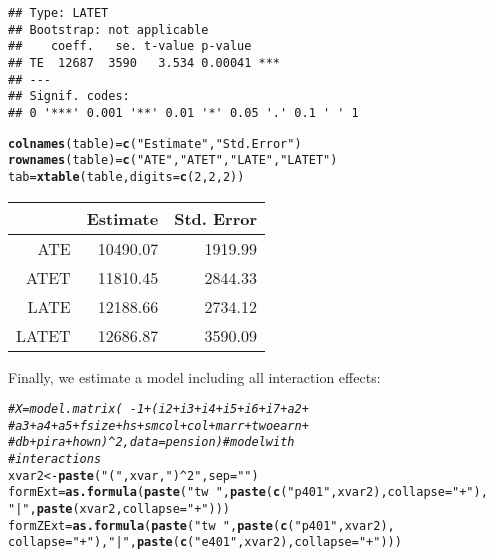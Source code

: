 \documentclass{amsart}\usepackage[]{graphicx}\usepackage[]{color}
\makeatletter
\newcommand{\hlnum}[1]{\textcolor[rgb]{0.686,0.059,0.569}{#1}}%
\newcommand{\hlstr}[1]{\textcolor[rgb]{0.192,0.494,0.8}{#1}}%
\newcommand{\hlcom}[1]{\textcolor[rgb]{0.678,0.584,0.686}{\textit{#1}}}%
\newcommand{\hlstd}[1]{\textcolor[rgb]{0.345,0.345,0.345}{#1}}%
\newcommand{\hlkwb}[1]{\textcolor[rgb]{0.69,0.353,0.396}{#1}}%
\newcommand{\hlkwc}[1]{\textcolor[rgb]{0.333,0.667,0.333}{#1}}%
\newcommand{\hlkwd}[1]{\textcolor[rgb]{0.737,0.353,0.396}{\textbf{#1}}}%
\newenvironment{kframe}{%
 \def\at@end@of@kframe{}%
 \ifinner\ifhmode%
  \def\at@end@of@kframe{\end{minipage}}%
  \begin{minipage}{\columnwidth}%
 \fi\fi%
 \def\FrameCommand##1{\hskip\@totalleftmargin \hskip-\fboxsep
 \colorbox{shadecolor}{##1}\hskip-\fboxsep
     \hskip-\linewidth \hskip-\@totalleftmargin \hskip\columnwidth}%
 \MakeFramed {\advance\hsize-\width
   \@totalleftmargin\z@ \linewidth\hsize
   \@setminipage}}%
 {\par\unskip\endMakeFramed%
 \at@end@of@kframe}
\newenvironment{knitrout}{}{} %
\makeatother
\begin{document}
\begin{knitrout}
\begin{kframe}
\begin{verbatim}
## Type: LATET 
## Bootstrap: not applicable 
##    coeff.   se. t-value p-value    
## TE  12687  3590   3.534 0.00041 ***
## ---
## Signif. codes:  
## 0 '***' 0.001 '**' 0.01 '*' 0.05 '.' 0.1 ' ' 1
\end{verbatim}
\begin{alltt}
\hlkwd{colnames}\hlstd{(table)} \hlkwb{=} \hlkwd{c}\hlstd{(}\hlstr{"Estimate"}\hlstd{,} \hlstr{"Std. Error"}\hlstd{)}
\hlkwd{rownames}\hlstd{(table)} \hlkwb{=} \hlkwd{c}\hlstd{(}\hlstr{"ATE"}\hlstd{,} \hlstr{"ATET "}\hlstd{,} \hlstr{"LATE"}\hlstd{,} \hlstr{"LATET"}\hlstd{)}
\hlstd{tab} \hlkwb{=} \hlkwd{xtable}\hlstd{(table,} \hlkwc{digits} \hlstd{=} \hlkwd{c}\hlstd{(}\hlnum{2}\hlstd{,} \hlnum{2}\hlstd{,} \hlnum{2}\hlstd{))}
\end{alltt}
\end{kframe}
\end{knitrout}

\begin{table}[ht]
\centering
\begin{tabular}{rrr}
  \hline
 & Estimate & Std. Error \\ 
  \hline
ATE & 10490.07 & 1919.99 \\ 
  ATET  & 11810.45 & 2844.33 \\ 
  LATE & 12188.66 & 2734.12 \\ 
  LATET & 12686.87 & 3590.09 \\ 
   \hline
\end{tabular}
\end{table}


Finally, we estimate a model including all interaction effects:

\begin{knitrout}
\color{fgcolor}\begin{kframe}
\begin{alltt}
\hlcom{# X = model.matrix(~ -1 + (i2 + i3 + i4 + i5 + i6 + i7 + a2 +}
\hlcom{# a3 + a4 + a5 + fsize + hs + smcol + col + marr + twoearn +}
\hlcom{# db + pira + hown)^2, data = pension) # model with}
\hlcom{# interactions}
\hlstd{xvar2} \hlkwb{<-} \hlkwd{paste}\hlstd{(}\hlstr{"("}\hlstd{, xvar,} \hlstr{")^2"}\hlstd{,} \hlkwc{sep} \hlstd{=} \hlstr{""}\hlstd{)}
\hlstd{formExt} \hlkwb{=} \hlkwd{as.formula}\hlstd{(}\hlkwd{paste}\hlstd{(}\hlstr{"tw ~ "}\hlstd{,} \hlkwd{paste}\hlstd{(}\hlkwd{c}\hlstd{(}\hlstr{"p401"}\hlstd{, xvar2),} \hlkwc{collapse} \hlstd{=} \hlstr{"+"}\hlstd{),}
    \hlstr{"|"}\hlstd{,} \hlkwd{paste}\hlstd{(xvar2,} \hlkwc{collapse} \hlstd{=} \hlstr{"+"}\hlstd{)))}
\hlstd{formZExt} \hlkwb{=} \hlkwd{as.formula}\hlstd{(}\hlkwd{paste}\hlstd{(}\hlstr{"tw ~ "}\hlstd{,} \hlkwd{paste}\hlstd{(}\hlkwd{c}\hlstd{(}\hlstr{"p401"}\hlstd{, xvar2),}
    \hlkwc{collapse} \hlstd{=} \hlstr{"+"}\hlstd{),} \hlstr{"|"}\hlstd{,} \hlkwd{paste}\hlstd{(}\hlkwd{c}\hlstd{(}\hlstr{"e401"}\hlstd{, xvar2),} \hlkwc{collapse} \hlstd{=} \hlstr{"+"}\hlstd{)))}
\end{alltt}
\end{kframe}
\end{knitrout}
\end{document}
